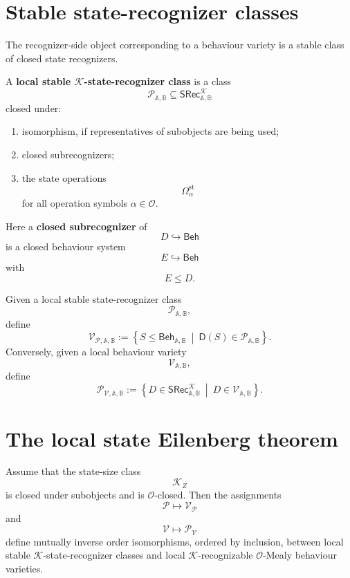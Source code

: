 \section{Stable state-recognizer classes}
\label{sec:state-eilenberg-stable-state-recognizer-classes}

The recognizer-side object corresponding to a behaviour variety is a stable
class of closed state recognizers.

\begin{definition}
\label{def:state-eilenberg-stable-state-recognizer-class}
A \textbf{local stable \(\mathcal K\)-state-recognizer class} is a class
\[
\mathcal P_{\mathbb A,\mathbb B}
\subseteq
\mathsf{SRec}^{\mathcal K}_{\mathbb A,\mathbb B}
\]
closed under:
\begin{enumerate}
\item isomorphism, if representatives of subobjects are being used;
\item closed subrecognizers;
\item the state operations
\[
\Omega_\alpha^{\mathrm{st}}
\]
for all operation symbols \(\alpha\in\mathcal O\).
\end{enumerate}
\end{definition}

Here a \textbf{closed subrecognizer} of
\[
D\hookrightarrow\mathsf{Beh}
\]
is a closed behaviour system
\[
E\hookrightarrow\mathsf{Beh}
\]
with
\[
E\leq D.
\]

Given a local stable state-recognizer class
\[
\mathcal P_{\mathbb A,\mathbb B},
\]
define
\[
\mathcal V_{\mathcal P,\mathbb A,\mathbb B}
:=
\left\{
S\leq\mathsf{Beh}_{\mathbb A,\mathbb B}
\ \middle|\
\mathsf D(S)\in\mathcal P_{\mathbb A,\mathbb B}
\right\}.
\]
Conversely, given a local behaviour variety
\[
\mathcal V_{\mathbb A,\mathbb B},
\]
define
\[
\mathcal P_{\mathcal V,\mathbb A,\mathbb B}
:=
\left\{
D\in\mathsf{SRec}^{\mathcal K}_{\mathbb A,\mathbb B}
\ \middle|\
D\in\mathcal V_{\mathbb A,\mathbb B}
\right\}.
\]

\section{The local state Eilenberg theorem}
\label{sec:state-eilenberg-local-state-correspondence}

\begin{theorem}
\label{thm:state-eilenberg-state-correspondence}
Assume that the state-size class
\[
\mathcal K_Z
\]
is closed under subobjects and is \(\mathcal O\)-closed. Then the assignments
\[
\mathcal P\longmapsto\mathcal V_{\mathcal P}
\]
and
\[
\mathcal V\longmapsto\mathcal P_{\mathcal V}
\]
define mutually inverse order isomorphisms, ordered by inclusion, between
local stable \(\mathcal K\)-state-recognizer classes and local
\(\mathcal K\)-recognizable \(\mathcal O\)-Mealy behaviour varieties.
\end{theorem}


